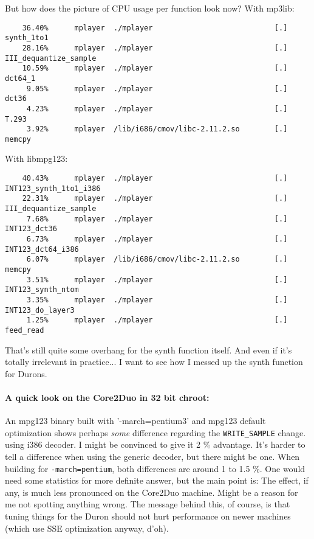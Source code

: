 \documentclass[a4paper,12pt]{scrartcl}
\begin{document}
But how does the picture of CPU usage per function look now?
With mp3lib:
\begin{verbatim}
    36.40%      mplayer  ./mplayer                            [.] synth_1to1
    28.16%      mplayer  ./mplayer                            [.] III_dequantize_sample
    10.59%      mplayer  ./mplayer                            [.] dct64_1
     9.05%      mplayer  ./mplayer                            [.] dct36
     4.23%      mplayer  ./mplayer                            [.] T.293
     3.92%      mplayer  /lib/i686/cmov/libc-2.11.2.so        [.] memcpy
\end{verbatim}
With libmpg123:
\begin{verbatim}
    40.43%      mplayer  ./mplayer                            [.] INT123_synth_1to1_i386
    22.31%      mplayer  ./mplayer                            [.] III_dequantize_sample
     7.68%      mplayer  ./mplayer                            [.] INT123_dct36
     6.73%      mplayer  ./mplayer                            [.] INT123_dct64_i386
     6.07%      mplayer  /lib/i686/cmov/libc-2.11.2.so        [.] memcpy
     3.51%      mplayer  ./mplayer                            [.] INT123_synth_ntom
     3.35%      mplayer  ./mplayer                            [.] INT123_do_layer3
     1.25%      mplayer  ./mplayer                            [.] feed_read
\end{verbatim}
That's still quite some overhang for the synth function itself.
And even if it's totally irrelevant in practice... I want to see how I messed up the synth function for Durons.

\paragraph{A quick look on the Core2Duo in 32 bit chroot:}
An mpg123 binary built with '-march=pentium3' and mpg123 default optimization shows perhaps {\em some} difference regarding the \verb:WRITE_SAMPLE: change. using i386 decoder.
I might be convinced to give it 2 \% advantage.
It's harder to tell a difference when using the generic decoder, but there might be one. When building for \verb:-march=pentium:, both differences are around 1 to 1.5 \%.
One would need some statistics for more definite answer, but the main point is: The effect, if any, is much less pronounced on the Core2Duo machine. Might be a reason for me not spotting anything wrong. The message behind this, of course, is that tuning things for the Duron should not hurt performance on newer machines (which use SSE optimization anyway, d'oh).
\end{document}
